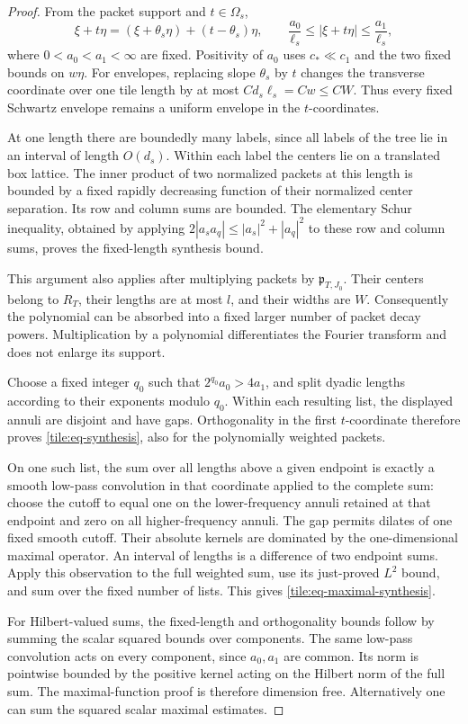 \begin{proof}
From the packet support and \(t\in\Omega_s\),
\[
 \xi+t\eta=(\xi+\theta_s\eta)+(t-\theta_s)\eta,
 \qquad
 \frac{a_0}{\ell_s}\leq|\xi+t\eta|
                         \leq\frac{a_1}{\ell_s},
\]
where \(0<a_0<a_1<\infty\) are fixed.  Positivity of \(a_0\)
uses \(c_*\ll c_1\) and the two fixed bounds on \(w\eta\).
For envelopes, replacing slope \(\theta_s\) by \(t\) changes
the transverse coordinate over one tile length by at most
\(C d_s\ell_s=Cw\leq CW\).  Thus every fixed Schwartz
envelope remains a uniform envelope in the \(t\)-coordinates.

At one length there are boundedly many labels, since all labels
of the tree lie in an interval of length \(O(d_s)\).  Within
each label the centers lie on a translated box lattice.  The
inner product of two normalized packets at this length is
bounded by a fixed rapidly decreasing function of their
normalized center separation.  Its row and column sums are
bounded.  The elementary Schur inequality, obtained by applying
\(2|a_sa_q|\leq |a_s|^2+|a_q|^2\) to these row and column
sums, proves the fixed-length synthesis bound.

This argument also applies after multiplying packets by
\(\mathfrak p_{T,J_0}\).  Their centers belong to \(R_T\),
their lengths are at most \(l\), and their widths are \(W\).
Consequently the polynomial can be absorbed into a fixed
larger number of packet decay powers.  Multiplication by a
polynomial differentiates the Fourier transform and does not
enlarge its support.

Choose a fixed integer \(q_0\) such that
\(2^{q_0}a_0>4a_1\), and split dyadic lengths according to
their exponents modulo \(q_0\).  Within each resulting list,
the displayed annuli are disjoint and have gaps.  Orthogonality
in the first \(t\)-coordinate therefore proves
\eqref{tile:eq-synthesis}, also for the polynomially weighted
packets.

On one such list, the sum over all lengths above a given
endpoint is exactly a smooth low-pass convolution in that
coordinate applied to the complete sum: choose the cutoff to
equal one on the lower-frequency annuli retained at that
endpoint and zero on all higher-frequency annuli.  The gap
permits dilates of one fixed smooth cutoff.  Their absolute
kernels are dominated by the one-dimensional maximal
operator.  An interval of lengths is a difference of two
endpoint sums.  Apply this observation to the full weighted
sum, use its just-proved \(L^2\) bound, and sum over the fixed
number of lists.  This gives
\eqref{tile:eq-maximal-synthesis}.

For Hilbert-valued sums, the fixed-length and orthogonality
bounds follow by summing the scalar squared bounds over
components.  The same low-pass convolution acts on every
component, since \(a_0,a_1\) are common.  Its norm is
pointwise bounded by the positive kernel acting on the
Hilbert norm of the full sum.  The maximal-function proof
is therefore dimension free.  Alternatively one can sum
the squared scalar maximal estimates.
\end{proof}

